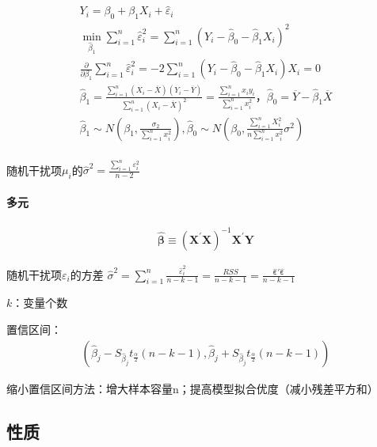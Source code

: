 \documentclass[12pt]{book}
\begin{document}
\begin{gather*}
    Y_i = \beta_0+\beta_{1}X_{i}+{\hat{\varepsilon}}_i\\
    \min_{{\hat{\beta}}_1}{\sum_{i=1}^{n}{\hat{\varepsilon}}_i^2} =\sum_{i=1}^{n}{\left(Y_i-{\hat{\beta}}_0-{\hat{\beta}}_1 X_i\right)^2}\\
    \frac{\partial}{\partial \beta_{1}}  \sum_{i=1}^{n}{\hat\varepsilon_i^2} =-2\sum_{i=1}^{n}{(Y_i-\hat{\beta}_{0}-\hat{\beta}_{1} X_i) X_{i}}=0\\
    \hat{\beta}_{1} = \frac{\sum_{i=1}^{n}\left(X_i-\overline{X}\right)\left(Y_i-\overline{Y}\right)}{\sum_{i=1}^{n}\left(X_i-\overline{X}\right)^2}=\frac{\sum_{i=1}^{n}{x_i y_i}}{\sum_{i=1}^{n}x_i^2}，\hat{\beta}_{0}=\overline{Y}-\hat{\beta}_{1}\overline{X}\\
    {\hat{\beta}}_1 \sim N\left(\beta_1,\frac{\sigma_2}{\sum_{i=1}^{n}{x_i^2}}\right), \hat{\beta}_{0} \sim N\left(\beta_0, \frac{\sum_{i=1}^{n}{X_i^2}}{ n \sum_{i=1}^{n}{x_i^2}} \sigma^2\right)\\
\end{gather*}


随机干扰项$\mu_{i}$的$\hat{\sigma}^2 =\frac{\sum_{i=1}^{n}{\varepsilon_i^2}}{n-2}$

\paragraph{多元}

\begin{gather*}
    \hat{\bm{\beta}} \equiv \left(\bm{X}^\prime\bm{X}\right)^{-1}\bm{X}^\prime\bm{Y}
\end{gather*}

随机干扰项$\varepsilon_i$的方差
$\hat{\sigma}^2  = \sum_{i=1}^{n}{ 	\frac{ \hat{\varepsilon}_i^2 }{n-k-1} 	} = \frac{RSS}{n-k-1} = \frac{\bm{\hat{\varepsilon}'\hat{\varepsilon}}}{n-k-1}$

$k$：变量个数

置信区间：
\begin{gather*}
    \left( \hat{\beta}_j-S_{\hat{\beta}_j} t_{\frac{\alpha}{2}}(n-k-1), \hat{\beta}_j+S_{\hat{\beta}_j} t_{\frac{\alpha}{2}}(n-k-1) \right)
\end{gather*}

缩小置信区间方法：增大样本容量n；提高模型拟合优度（减小残差平方和）

\subsection{性质}
\end{document}
